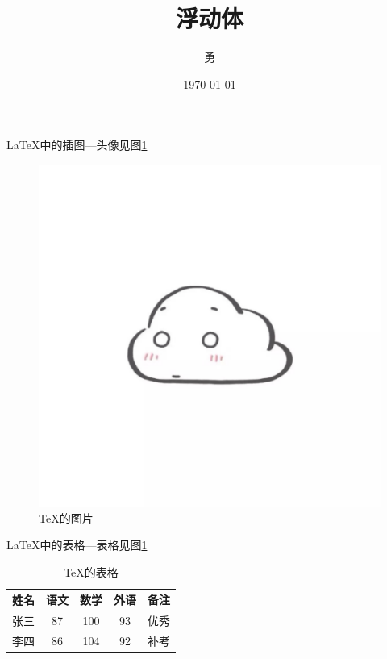 \documentclass{article}
\title{浮动体}
\author{勇}
\date{\today}
\begin{document}
	\maketitle
	
	\LaTeX 中的插图---头像见图\ref{fig-头像}
	\begin{figure}[htbp]
		\centering
		\includegraphics[scale=0.1]{头像}
		\caption{\TeX 的图片}\label{fig-头像}
	\end{figure}
	
	\LaTeX 中的表格---表格见图\ref{tab-score}
	\begin{table}[htbp]
		\centering
		\caption{\TeX 的表格}\label{tab-score}
		\begin{tabular}{|l||c|c|c|p{1.5cm}|}
			\hline
			姓名 & 语文 & 数学 & 外语 & 备注\\
			\hline \hline
			张三 & 87 & 100 & 93 & 优秀\\
			\hline
			李四 & 86 & 104 & 92 & 补考\\
			\hline
		\end{tabular}
	\end{table}
	
\end{document}
